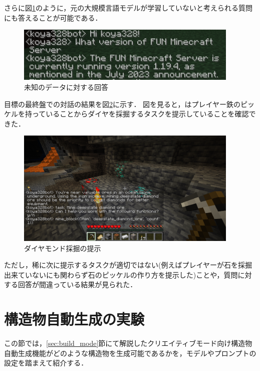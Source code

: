 さらに図\ref{fig:server_version}のように，元の大規模言語モデルが学習していないと考えられる質問にも答えることが可能である．
\begin{figure}[H]
    \centering
    \includegraphics[width=0.95\textwidth]{fig/server_version.PNG}
    \caption{未知のデータに対する回答}
    \label{fig:server_version}
\end{figure}

目標の最終盤での対話の結果を図\ref{fig:final_task}に示す．
図を見ると，{\mason}はプレイヤー鉄のピッケルを持っていることからダイヤを採掘するタスクを提示していることを確認できた．

\begin{figure}[H]
    \centering
    \includegraphics[width=0.95\textwidth]{fig/final_task.png}
    \caption{ダイヤモンド採掘の提示}
    \label{fig:final_task}
\end{figure}

ただし，稀に次に提示するタスクが適切ではない(例えばプレイヤーが石を採掘出来ていないにも関わらず石のピッケルの作り方を提示した)ことや，質問に対する回答が間違っている結果が見られた．

\section{構造物自動生成の実験}\label{sec:build_mode_generate}
この節では，\ref{sec:build_mode}節にて解説したクリエイティブモード向け構造物自動生成機能がどのような構造物を生成可能であるかを，モデルやプロンプトの設定を踏まえて紹介する．

